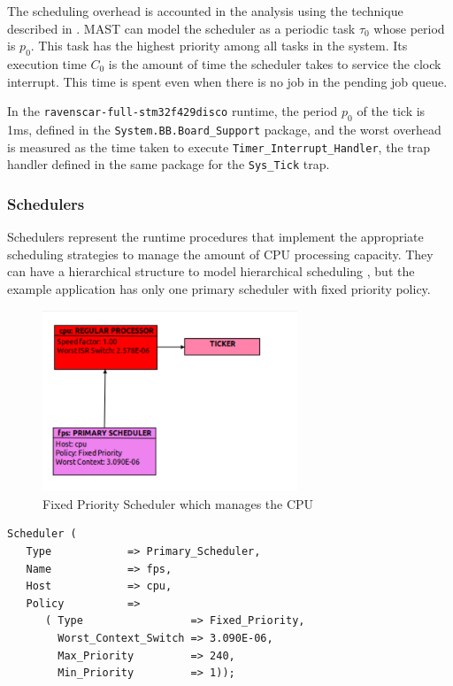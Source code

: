 \documentclass{article}
\begin{document}
The scheduling overhead is accounted in the analysis using the technique described in \cite{effects-runtime}. MAST can model the scheduler as a periodic task $\tau_0$ whose period is $p_0$. This task has the highest priority among all tasks in the system. Its execution time $C_0$ is the amount of time the scheduler takes to service the clock interrupt. This time is spent even when there is no job in the pending job queue.

In the \texttt{ravenscar-full-stm32f429disco} runtime, the period $p_0$ of the tick is 1ms, defined in the \texttt{System.BB.Board\_Support} package, and the worst overhead is measured as the time taken to execute \texttt{Timer\_Interrupt\_Handler}, the trap handler defined in the same package for the \texttt{Sys\_Tick} trap.

\subsubsection{Schedulers}

Schedulers represent the runtime procedures that implement the appropriate scheduling strategies to manage the amount of CPU processing capacity. They can have a hierarchical structure to model hierarchical scheduling \cite{hierarchical-scheduling}, but the example application has only one primary scheduler with fixed priority policy.

\begin{figure}[!htbp]
\centering
\includegraphics[width=3in]{images/primary-scheduler}
\caption{Fixed Priority Scheduler which manages the CPU}
\label{primary-scheduler}
\end{figure}

\begin{lstlisting}
Scheduler (
   Type            => Primary_Scheduler,
   Name            => fps,
   Host            => cpu,
   Policy          =>
      ( Type                 => Fixed_Priority,
        Worst_Context_Switch => 3.090E-06,
        Max_Priority         => 240,
        Min_Priority         => 1));
\end{lstlisting}
\end{document}

